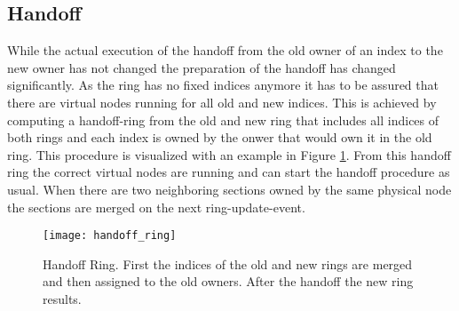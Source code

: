 \subsection{Handoff}
While the actual execution of the handoff from the old owner of an index to the new owner has not changed the preparation of the handoff has changed significantly.
As the ring has no fixed indices anymore it has to be assured that there are virtual nodes running for all old and new indices.
This is achieved by computing a handoff-ring from the old and new ring that includes all indices of both rings and each index is owned by the onwer that would own it in the old ring.
This procedure is visualized with an example in Figure \ref{fig:handoff_ring}.
From this handoff ring the correct virtual nodes are running and can start the handoff procedure as usual.
When there are two neighboring sections owned by the same physical node the sections are merged on the next ring-update-event.

\begin{figure}
\texttt{[image: handoff\_ring]}
\caption[Handoff Ring]{Handoff Ring. First the indices of the old and new rings are merged and then assigned to the old owners. After the handoff the new ring results.}
\label{fig:handoff_ring}
\end{figure}